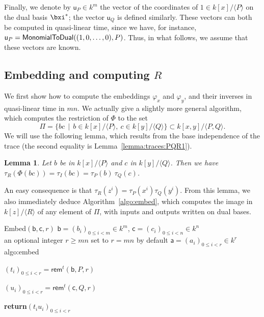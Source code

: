 \documentclass{sig-alternate}
\def\va {\ensuremath{\mathsf{a}}}
\def\vu {\ensuremath{\mathsf{u}}}
\def\vb {\ensuremath{\mathsf{b}}}
\def\vc {\ensuremath{\mathsf{c}}}
\def\rem {\ensuremath{\mathsf{rem}}}
\newcounter{algo}
\newenvironment{algorithm_endline}[4]{\small\begin{center}\begin{minipage}{0.48\textwidth}
      \refstepcounter{algo}
      \label{#4}
      \sf
      \rule{\textwidth}{0.2pt}\\
      \makebox[\textwidth][c]{Algorithm~\arabic{algo}:~\textbf{#1}}\\
      \rule[0.5\baselineskip]{\textwidth}{0.2pt}\\

      \vspace{-12pt}

      \parbox{\textwidth}{\textbf{Input} #2}
      \parbox{\textwidth}{\textbf{Output} #3}

\vspace{-7pt}

      \begin{enumerate*}}{\end{enumerate*}
      \vspace{-11pt}
      \rule{\textwidth}{0.2pt}
\end{minipage}\end{center}
}
\newcommand{\ang}[1]{\langle#1\rangle}
\newtheorem{Lemma}{Lemma}
\begin{document}
Finally, we denote by $\vu_P \in k^m$ the vector of the coordinates of
$1 \in k[x]/\ang{P}$ on the dual basis $\bxi^\ast$; the vector
$\vu_Q$ is defined similarly. These vectors can both be computed in
quasi-linear time, since we have, for instance, $\vu_P = {\sf
  MonomialToDual}((1,0,\dots,0), P)$. Thus, in what follows, we assume
that these vectors are known.


\subsection{Embedding and computing $R$} 

We first show how to compute the embeddings $\varphi_x$ and
$\varphi_y$, and their inverses in quasi-linear time in $mn$. We
actually give a slightly more general algorithm, which computes the
restriction of $\Phi$ to the set $$\Pi= \{bc \,\mid\, b\in
k[x]/\ang{P},\ c\in k[y]/\ang{Q}\} \subset k[x,y]/\ang{P,Q}.$$ We
will use the following lemma, which results from the base independence
of the trace (the second equality is Lemma~\ref{lemma:traces:PQR1}).
\begin{Lemma}
  \label{lemma:traces:PQR}
  Let $b$ be in $k[x]/\ang{P}$ and $c$ in $k[y]/\ang{Q}$. Then we have
  $\tau_R(\Phi(bc)) = \tau_I(bc) = \tau_P(b) \ \tau_Q(c)$.
\end{Lemma}
An easy consequence is that $\tau_R(z^i) =
\tau_P(x^i)\tau_Q(y^i)$. From this lemma, we also immediately deduce
Algorithm~\ref{algo:embed}, which computes the image in $k[z]/\ang{R}$
of any element of $\Pi$, with inputs and outputs written on dual
bases.

\vspace{-2ex}

\begin{algorithm_endline}
{Embed$(\vb,\vc,r)$}
{$\vb=(b_i)_{0 \le i < m} \in k^m$, $\vc=(c_i)_{0 \le i < n} \in k^n$\\
    an optional integer $r \ge mn$ set to $r=mn$ by default}
{$\va=(a_i)_{0 \le i < r} \in k^{r}$}
{algo:embed}
\item $(t_i)_{0\le i<r} = \rem^t(\vb,P,r)$
\item $(u_i)_{0\le i<r} = \rem^t(\vc,Q,r)$
\item {\bf return}$(t_i u_i)_{0 \le i <r}$
\end{algorithm_endline}
\end{document}

